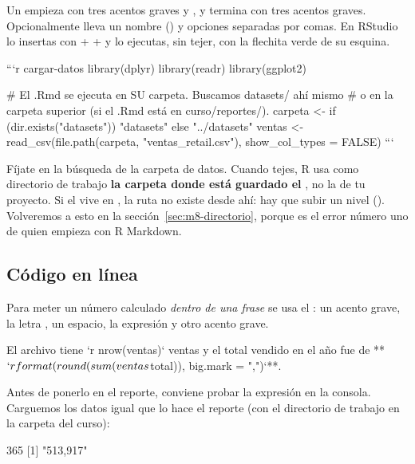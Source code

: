 Un  empieza con tres acentos graves y , y
termina con tres acentos graves. Opcionalmente lleva un nombre
() y opciones separadas por comas. En RStudio lo
insertas con  +  +  y lo ejecutas, sin
tejer, con la flechita verde de su esquina.

\begin{textocodigo}
```{r cargar-datos}
library(dplyr)
library(readr)
library(ggplot2)

# El .Rmd se ejecuta en SU carpeta. Buscamos datasets/ ahí mismo
# o en la carpeta superior (si el .Rmd está en curso/reportes/).
carpeta <- if (dir.exists("datasets")) "datasets" else "../datasets"
ventas <- read_csv(file.path(carpeta, "ventas_retail.csv"),
                   show_col_types = FALSE)
```
\end{textocodigo}

Fíjate en la búsqueda de la carpeta de datos. Cuando tejes, R usa como
directorio de trabajo \textbf{la carpeta donde está guardado el
}, no la de tu proyecto. Si el  vive en
, la ruta  no existe
desde ahí: hay que subir un nivel (). Volveremos a esto
en la sección~\ref{sec:m8-directorio}, porque es el error número uno de quien
empieza con R Markdown.

\subsection{Código en línea}

Para meter un número calculado \emph{dentro de una frase} se usa el
: un acento grave, la letra , un espacio,
la expresión y otro acento grave.

\begin{textocodigo}
El archivo tiene `r nrow(ventas)` ventas y el total vendido en el año
fue de **$`r format(round(sum(ventas$total)), big.mark = ",")`**.
\end{textocodigo}

Antes de ponerlo en el reporte, conviene probar la expresión en la consola.
Carguemos los datos igual que lo hace el reporte (con el directorio de
trabajo en la carpeta del curso):

\begin{rsalida}
[1] 365
[1] "513,917"
\end{rsalida}

